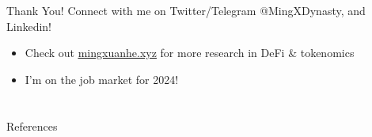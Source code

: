 \documentclass{beamer}
\begin{document}
\begin{frame}{Thank You!}
    Connect with me on Twitter/Telegram @MingXDynasty, and Linkedin!\\ 
    \bigskip
    \begin{itemize}
        \item Check out \href{https://www.mingxuanhe.xyz/}{\underline{mingxuanhe.xyz}} for more research in DeFi \& tokenomics
        \item I'm on the job market for 2024!
 
    \end{itemize}
   

\end{frame}

\section*{}

\begin{frame}[allowframebreaks]{References}
    \nocite{*}
    \printbibliography
\end{frame}
\end{document}
